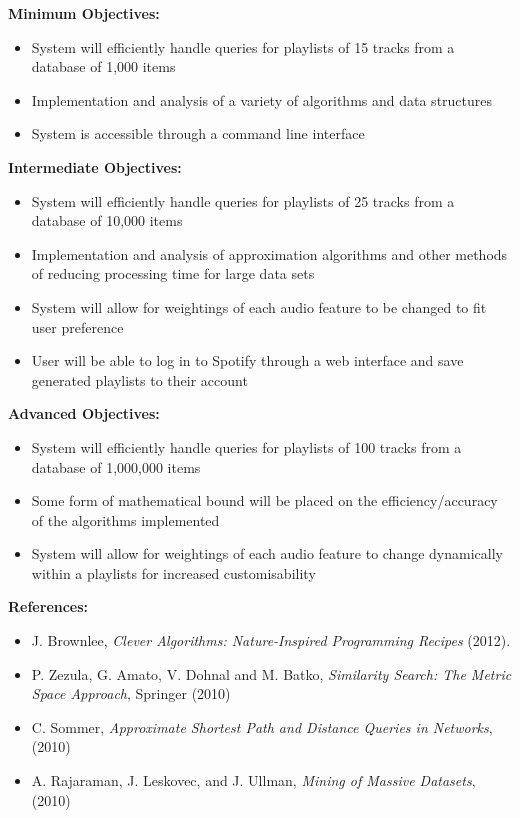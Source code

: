 \documentclass[10pt]{article}
\begin{document}
{\bf Minimum Objectives:}
  \begin{itemize}  
    \item System will efficiently handle queries for playlists of 15 tracks from a database of 1,000 items
    \item Implementation and analysis of a variety of algorithms and data structures
    \item System is accessible through a command line interface  
  \end{itemize}
{\bf Intermediate Objectives:}
  \begin{itemize}  
    \item System will efficiently handle queries for playlists of 25 tracks from a database of 10,000 items
    \item Implementation and analysis of approximation algorithms and other methods of reducing processing time for large data sets
    \item System will allow for weightings of each audio feature to be changed to fit user preference
    \item User will be able to log in to Spotify through a web interface and save generated playlists to their account
  \end{itemize}
{\bf Advanced Objectives:}
  \begin{itemize}  
    \item System will efficiently handle queries for playlists of 100 tracks from a database of 1,000,000 items
    \item Some form of mathematical bound will be placed on the efficiency/accuracy of the algorithms implemented
    \item System will allow for weightings of each audio feature to change dynamically within a playlists for increased customisability 
  \end{itemize}
{\bf References:}
  \begin{itemize}  
    \item J. Brownlee, {\it Clever Algorithms: Nature-Inspired Programming Recipes} (2012).
    \item P. Zezula, G. Amato, V. Dohnal and M. Batko, {\it Similarity Search: The Metric Space Approach}, Springer (2010)
    \item C. Sommer, {\it Approximate Shortest Path and Distance Queries in Networks}, (2010)
    \item A. Rajaraman, J. Leskovec, and J. Ullman, {\it Mining of Massive Datasets}, (2010)

  \end{itemize}
\end{document}
